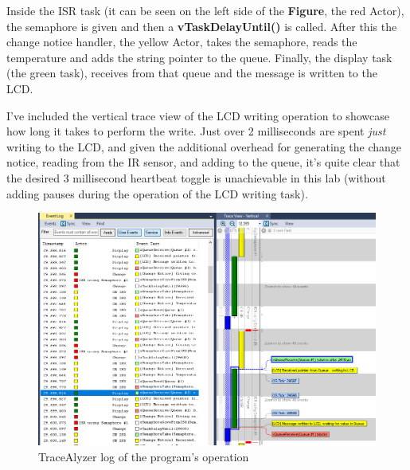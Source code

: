 \documentclass[a4paper, 12pt]{article}
\begin{document}
Inside the ISR task (it can be seen on the left side of the \textbf{Figure}, the red Actor), the semaphore is given and then a \textbf{vTaskDelayUntil()} is called. After this the change notice handler, the yellow Actor, takes the semaphore, reads the temperature and adds the string pointer to the queue. Finally, the display task (the green task), receives from that queue and the message is written to the LCD.

I've included the vertical trace view of the LCD writing operation to showcase how long it takes to perform the write. Just over 2 milliseconds are spent \emph{just} writing to the LCD, and given the additional overhead for generating the change notice, reading from the IR sensor, and adding to the queue, it's quite clear that the desired 3 millisecond heartbeat toggle is unachievable in this lab (without adding pauses during the operation of the LCD writing task).

\begin{figure}[H]
\centering
\includegraphics[width=\textwidth]{Operation.PNG}
\caption{TraceAlyzer log of the program's operation}
\label{fig:operation-log}
\end{figure}
\end{document}
